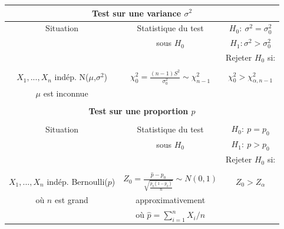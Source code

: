 \documentclass [12pt]{article}
\begin{document}
\begin{center}
\begin{tabular}{|c|c|c|}
\hline \multicolumn{3}{|c|}{{\bf Test sur une variance
$\sigma^2$}}
\\
\hline Situation & Statistique du test & $H_{0}:\  \sigma^2 =
\sigma^2_0$
\\
& sous $H_{0}$
& $H_{1}: \sigma^2 > \sigma^2_0 $
\\
 & & Rejeter $H_{0}$ si:
\\
\hline
\hline
 &  &
 \\
$ X_1,...,X_n$ indép. N($\mu$,$\sigma^2$) & $\displaystyle
\chi^2_0=\frac{(n-1)S^2}{\sigma^2_0}\sim\chi^2_{n-1}$ &
$\chi^2_{0}>\chi^2_{\alpha,n-1}$
\\
$\mu$ est inconnue & &
\\
\hline 
\multicolumn{3}{c}{ }
\\
\hline \multicolumn{3}{|c|}{{\bf Test sur une proportion $p$}}
\\
\hline &&\\Situation & Statistique du test & $H_{0}:\  p = p_{0}$
\\
& sous $H_{0}$ & $H_{1}:\  p > p_{0}$
\\
 & & Rejeter $H_{0}$ si:
\\
\hline \hline
 &  &
 \\
$ X_1,...,X_n$ indép. Bernoulli($p$)
 & $\displaystyle
Z_{0}=\frac{{\hat p} - p_{0}}
{\sqrt{\displaystyle\frac{p_{0}(1-p_{0})}{n}}} \sim N(0,1)$ &
$Z_{0}>Z_{\alpha}$
\\
où $n$ est grand & approximativement &
\\
 & où ${\hat p}=\sum\limits_{i=1}^{n}X_i/n$ &
\\
\hline
\end{tabular}
\end{center}
\end{document}
